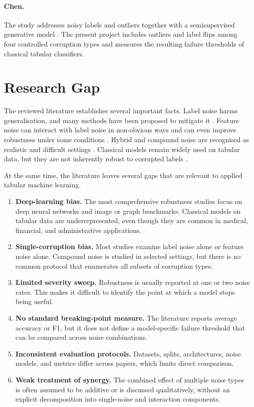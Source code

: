 \paragraph{Chen.}
The study addresses noisy labels and outliers together with a semisupervised generative model \cite{chen2023compound}. The present project includes outliers and label flips among four controlled corruption types and measures the resulting failure thresholds of classical tabular classifiers.

\section{Research Gap}

The reviewed literature establishes several important facts. Label noise harms generalisation, and many methods have been proposed to mitigate it \cite{song2023survey}. Feature noise can interact with label noise in non-obvious ways and can even improve robustness under some conditions \cite{zeng2025feature}. Hybrid and compound noise are recognised as realistic and difficult settings \cite{zhang2020hybrid,chen2023compound}. Classical models remain widely used on tabular data, but they are not inherently robust to corrupted labels \cite{frenay2014classification,song2023survey}.

At the same time, the literature leaves several gaps that are relevant to applied tabular machine learning.

\begin{enumerate}
  \item \textbf{Deep-learning bias.} The most comprehensive robustness studies focus on deep neural networks and image or graph benchmarks. Classical models on tabular data are underrepresented, even though they are common in medical, financial, and administrative applications.
  \item \textbf{Single-corruption bias.} Most studies examine label noise alone or feature noise alone. Compound noise is studied in selected settings, but there is no common protocol that enumerates all subsets of corruption types.
  \item \textbf{Limited severity sweep.} Robustness is usually reported at one or two noise rates. This makes it difficult to identify the point at which a model stops being useful.
  \item \textbf{No standard breaking-point measure.} The literature reports average accuracy or F1, but it does not define a model-specific failure threshold that can be compared across noise combinations.
  \item \textbf{Inconsistent evaluation protocols.} Datasets, splits, architectures, noise models, and metrics differ across papers, which limits direct comparison.
  \item \textbf{Weak treatment of synergy.} The combined effect of multiple noise types is often assumed to be additive or is discussed qualitatively, without an explicit decomposition into single-noise and interaction components.
\end{enumerate}

